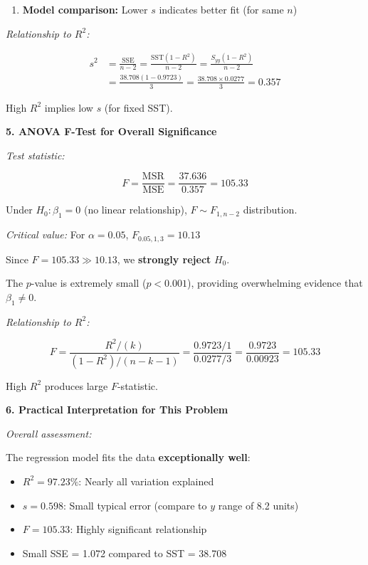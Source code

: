 \documentclass[12pt]{article}
\begin{document}
\begin{explanation}
\begin{enumerate}
    \item \textbf{Model comparison:} Lower $s$ indicates better fit (for same $n$)
\end{enumerate}

\textit{Relationship to $R^2$:}

\begin{align*}
s^2 &= \frac{\text{SSE}}{n-2} = \frac{\text{SST}(1-R^2)}{n-2} = \frac{S_{yy}(1-R^2)}{n-2} \\
&= \frac{38.708(1-0.9723)}{3} = \frac{38.708 \times 0.0277}{3} = 0.357
\end{align*}

High $R^2$ implies low $s$ (for fixed SST).

\textbf{5. ANOVA F-Test for Overall Significance}

\textit{Test statistic:}

\[
F = \frac{\text{MSR}}{\text{MSE}} = \frac{37.636}{0.357} = 105.33
\]

Under $H_0: \beta_1 = 0$ (no linear relationship), $F \sim F_{1, n-2}$ distribution.

\textit{Critical value:} For $\alpha = 0.05$, $F_{0.05, 1, 3} = 10.13$

Since $F = 105.33 \gg 10.13$, we \textbf{strongly reject} $H_0$.

The $p$-value is extremely small ($p < 0.001$), providing overwhelming evidence that $\beta_1 \neq 0$.

\textit{Relationship to $R^2$:}

\[
F = \frac{R^2/(k)}{(1-R^2)/(n-k-1)} = \frac{0.9723/1}{0.0277/3} = \frac{0.9723}{0.00923} = 105.33
\]

High $R^2$ produces large $F$-statistic.

\textbf{6. Practical Interpretation for This Problem}

\textit{Overall assessment:}

The regression model fits the data \textbf{exceptionally well}:

\begin{itemize}
    \item $R^2 = 97.23\%$: Nearly all variation explained
    \item $s = 0.598$: Small typical error (compare to $y$ range of 8.2 units)
    \item $F = 105.33$: Highly significant relationship
    \item Small SSE = 1.072 compared to SST = 38.708
\end{itemize}


\end{explanation}
\end{document}
